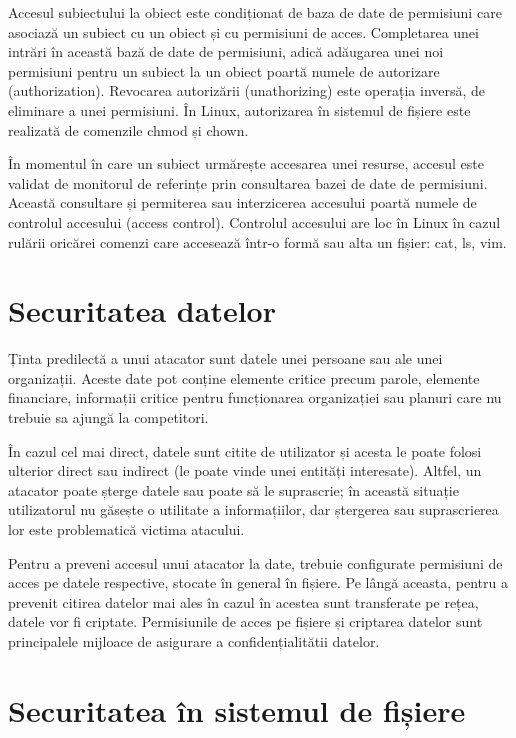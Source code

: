 Accesul subiectului la obiect este condiționat de baza de date de permisiuni care asociază un subiect cu un obiect și cu permisiuni de acces. Completarea unei intrări în această bază de date de permisiuni, adică adăugarea unei noi permisiuni pentru un subiect la un obiect poartă numele de autorizare (authorization). Revocarea autorizării (unathorizing) este operația inversă, de eliminare a unei permisiuni. În Linux, autorizarea în sistemul de fișiere este realizată de comenzile chmod și chown.

În momentul în care un subiect urmărește accesarea unei resurse, accesul este validat de monitorul de referințe prin consultarea bazei de date de permisiuni. Această consultare și permiterea sau interzicerea accesului poartă numele de controlul accesului (access control). Controlul accesului are loc în Linux în cazul rulării oricărei comenzi care accesează într-o formă sau alta un fișier: cat, ls, vim.

\section{Securitatea datelor}
\label{sec:sec:data}

Ținta predilectă a unui atacator sunt datele unei persoane sau ale unei organizații. Aceste date pot conține elemente critice precum parole, elemente financiare, informații critice pentru funcționarea organizației sau planuri care nu trebuie sa ajungă la competitori.

În cazul cel mai direct, datele sunt citite de utilizator și acesta le poate folosi ulterior direct sau indirect (le poate vinde unei entități interesate). Altfel, un atacator poate șterge datele sau poate să le suprascrie; în această situație utilizatorul nu găsește o utilitate a informațiilor, dar ștergerea sau suprascrierea lor este problematică victima atacului.

Pentru a preveni accesul unui atacator la date, trebuie configurate permisiuni de acces pe datele respective, stocate în general în fișiere. Pe lângă aceasta, pentru a prevenit citirea datelor mai ales în cazul în acestea sunt transferate pe rețea, datele vor fi criptate. Permisiunile de acces pe fișiere și criptarea datelor sunt principalele mijloace de asigurare a confidențialitătii datelor.

\section{Securitatea în sistemul de fișiere}
\label{sec:sec:fs}

